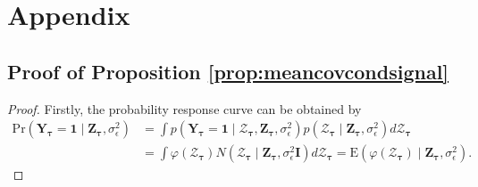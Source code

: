 \section*{Appendix}
\label{sec:appendix}

\subsection*{Proof of Proposition \ref{prop:meancovcondsignal}}
\label{subsec:proofmeancovcond}

\begin{proof}
Firstly, the probability response curve can be obtained by 
\begin{equation}
    \begin{split}
       \text{Pr}(\mathbf{Y}_{\boldsymbol{\tau}}=\mathbf{1}\mid\mathbf{Z}_{\boldsymbol{\tau}},\sigma_{\epsilon}^2)&=\int p(\mathbf{Y}_{\boldsymbol{\tau}}=\mathbf{1}\mid\boldsymbol{\mathcal{Z}}_{\boldsymbol{\tau}},\mathbf{Z}_{\boldsymbol{\tau}},\sigma_{\epsilon}^2)p(\boldsymbol{\mathcal{Z}}_{\boldsymbol{\tau}}\mid\mathbf{Z}_{\boldsymbol{\tau}},\sigma_{\epsilon}^2)d\boldsymbol{\mathcal{Z}}_{\boldsymbol{\tau}}\\
       &=\int \varphi(\boldsymbol{\mathcal{Z}}_{\boldsymbol{\tau}})N(\boldsymbol{\mathcal{Z}}_{\boldsymbol{\tau}}\mid\mathbf{Z}_{\boldsymbol{\tau}},\sigma_{\epsilon}^2\mathbf{I})d\boldsymbol{\mathcal{Z}}_{\boldsymbol{\tau}}=\text{E}(\varphi(\boldsymbol{\mathcal{Z}}_{\boldsymbol{\tau}})\mid \mathbf{Z}_{\boldsymbol{\tau}},\sigma_{\epsilon}^2).
    \end{split}
    \label{eq:probcurvecondsignal}
\end{equation}


\end{proof}
